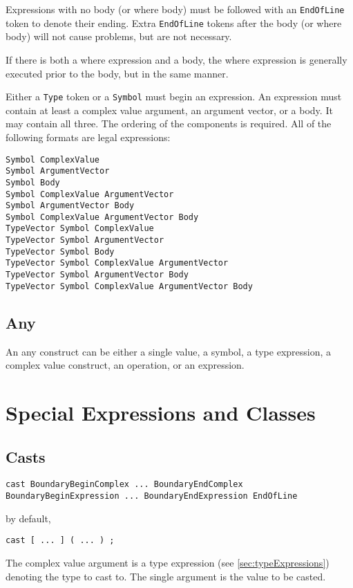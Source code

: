 \documentclass[10pt,a4paper]{article}
\begin{document}
Expressions with no body (or where body) must be followed with an \verb|EndOfLine| token to denote their ending. Extra \verb|EndOfLine| tokens after the body (or where body) will not cause problems, but are not necessary. 

If there is both a where expression and a body, the where expression is generally executed prior to the body, but in the same manner. 

Either a \verb|Type| token or a \verb|Symbol| must begin an expression. An expression must contain at least a complex value argument, an argument vector, or a body. It may contain all three. The ordering of the components is required. All of the following formats are legal expressions:
\begin{verbatim}
Symbol ComplexValue
Symbol ArgumentVector
Symbol Body
Symbol ComplexValue ArgumentVector
Symbol ArgumentVector Body
Symbol ComplexValue ArgumentVector Body
TypeVector Symbol ComplexValue
TypeVector Symbol ArgumentVector
TypeVector Symbol Body
TypeVector Symbol ComplexValue ArgumentVector
TypeVector Symbol ArgumentVector Body
TypeVector Symbol ComplexValue ArgumentVector Body
\end{verbatim}

\subsection{Any}
An any construct can be either a single value, a symbol, a type expression, a complex value construct, an operation, or an expression.

\section{Special Expressions and Classes}
\subsection{Casts}
\begin{verbatim}
cast BoundaryBeginComplex ... BoundaryEndComplex BoundaryBeginExpression ... BoundaryEndExpression EndOfLine
\end{verbatim}

by default,
\begin{verbatim}
cast [ ... ] ( ... ) ;
\end{verbatim}

The complex value argument is a type expression (see \ref{sec:typeExpressions}) denoting the type to cast to. The single argument is the value to be casted.
\end{document}
